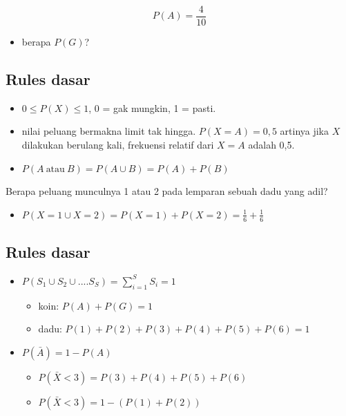 \documentclass[
  letterpaper,
  DIV=11,
  numbers=noendperiod]{scrartcl}
\providecommand{\tightlist}{%
  \setlength{\itemsep}{0pt}\setlength{\parskip}{0pt}}\usepackage{longtable,booktabs,array}
\begin{document}
\[
P(A)=\frac{4}{10}
\]

\begin{itemize}
\tightlist
\item
  berapa \(P(G)\)?
\end{itemize}

\hypertarget{rules-dasar}{%
\subsection{Rules dasar}\label{rules-dasar}}

\begin{itemize}
\item
  \(0 \leq P(X) \leq 1\), 0 = gak mungkin, 1 = pasti.
\item
  nilai peluang bermakna limit tak hingga. \(P(X=A)=0,5\) artinya jika
  \(X\) dilakukan berulang kali, frekuensi relatif dari \(X=A\) adalah
  0,5.
\item
  \(P(A \ \text{atau} \ B) = P(A \cup B)=P(A)+P(B)\)
\end{itemize}

Berapa peluang munculnya 1 atau 2 pada lemparan sebuah dadu yang adil?

\begin{itemize}
\tightlist
\item
  \(P(X=1 \cup X=2)=P(X=1)+P(X=2)=\frac{1}{6}+\frac{1}{6}\)
\end{itemize}

\hypertarget{rules-dasar-1}{%
\subsection{Rules dasar}\label{rules-dasar-1}}

\begin{itemize}
\item
  \(P(S_1 \cup S_2 \cup .... S_S)=\sum_{i=1}^S S_i=1\)

  \begin{itemize}
  \item
    koin: \(P(A)+P(G)=1\)
  \item
    dadu: \(P(1)+P(2)+P(3)+P(4)+P(5)+P(6)=1\)
  \end{itemize}
\item
  \(P(\bar{A})=1-P(A)\)

  \begin{itemize}
  \item
    \(P(\bar{X}<3)=P(3)+P(4)+P(5)+P(6)\)
  \item
    \(P(\bar{X}<3)=1-\left(P(1)+P(2) \right)\)
  \end{itemize}
\end{itemize}
\end{document}
